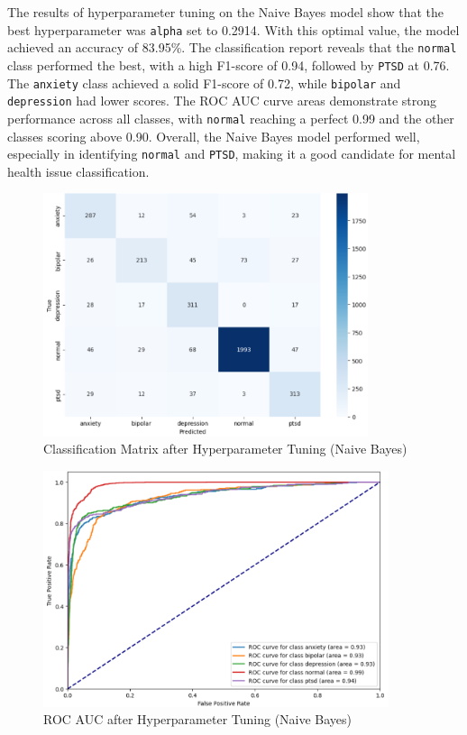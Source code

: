 \noindent
The results of hyperparameter tuning on the Naive Bayes model show that the best hyperparameter was \texttt{alpha} set to 0.2914. With this optimal value, the model achieved an accuracy of 83.95\%. The classification report reveals that the \texttt{normal} class performed the best, with a high F1-score of 0.94, followed by \texttt{PTSD} at 0.76. The \texttt{anxiety} class achieved a solid F1-score of 0.72, while \texttt{bipolar} and \texttt{depression} had lower scores. The ROC AUC curve areas demonstrate strong performance across all classes, with \texttt{normal} reaching a perfect 0.99 and the other classes scoring above 0.90. Overall, the Naive Bayes model performed well, especially in identifying \texttt{normal} and \texttt{PTSD}, making it a good candidate for mental health issue classification.

\begin{figure}[h!]  
    \centering
    \includegraphics[width=0.85\textwidth]{Images/HP NB CM.png}  
    \caption{Classification Matrix after Hyperparameter Tuning (Naive Bayes)}
    \label{LSTMROC7}  %
\end{figure}

\begin{figure}[h!]  
    \centering
    \includegraphics[width=0.9\textwidth]{Images/HP NB ROC.png}  
    \caption{ROC AUC after Hyperparameter Tuning (Naive Bayes)}
    \label{LSTMROC8}  %
\end{figure}

